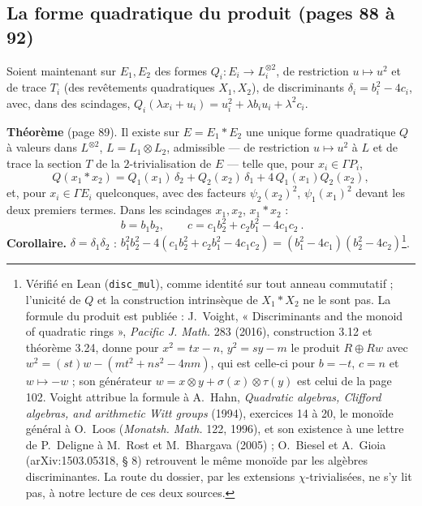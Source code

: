 \documentclass[11pt,a4paper]{article}
\begin{document}
\subsection*{La forme quadratique du produit (pages 88 à 92)}

Soient maintenant sur $E_1, E_2$ des formes $Q_i : E_i \to L_i^{\otimes 2}$, de restriction
$u \mapsto u^{2}$ et de trace $T_i$ (des revêtements quadratiques $X_1, X_2$), de
discriminants $\delta_i = b_i^{2} - 4c_i$, avec, dans des scindages,
$Q_i(\lambda x_i + u_i) = u_i^{2} + \lambda b_iu_i + \lambda^{2}c_i$.

\textbf{Théorème} (page 89). Il existe sur $E = E_1 * E_2$ une unique forme
quadratique $Q$ à valeurs dans $L^{\otimes 2}$, $L = L_1 \otimes L_2$, admissible ---
de restriction $u \mapsto u^{2}$ à $L$ et de trace la section $T$ de la
$2$-trivialisation de $E$ --- telle que, pour $x_i \in \Gamma P_i$,
\[
  Q(x_1 * x_2) = Q_1(x_1)\,\delta_2 + Q_2(x_2)\,\delta_1 + 4\,Q_1(x_1)Q_2(x_2),
\]
et, pour $x_i \in \Gamma E_i$ quelconques, avec des facteurs $\psi_2(x_2)^{2}$,
$\psi_1(x_1)^{2}$ devant les deux premiers termes. Dans les scindages $x_1, x_2$,
$x_1 * x_2$ :
\[
  \boxed{\ b = b_1b_2, \qquad c = c_1b_2^{2} + c_2b_1^{2} - 4c_1c_2\ } .
\]
\textbf{Corollaire.} $\delta = \delta_1\delta_2$ : $b_1^{2}b_2^{2} - 4(c_1b_2^{2} + c_2b_1^{2} -
4c_1c_2) = (b_1^{2} - 4c_1)(b_2^{2} - 4c_2)$\footnote{Vérifié en Lean
(\texttt{disc\_mul}), comme identité sur tout anneau commutatif ; l'unicité de $Q$ et
la construction intrinsèque de $X_1 * X_2$ ne le sont pas. La formule du produit
est publiée : J.~Voight, « Discriminants and the monoid of quadratic rings »,
\emph{Pacific J. Math.} 283 (2016), construction 3.12 et théorème 3.24, donne pour
$x^{2} = tx - n$, $y^{2} = sy - m$ le produit $R \oplus Rw$ avec $w^{2} = (st)w -
(mt^{2} + ns^{2} - 4nm)$, qui est celle-ci pour $b = -t$, $c = n$ et $w \mapsto -w$ ;
son générateur $w = x \otimes y + \sigma(x) \otimes \tau(y)$ est celui de la page 102.
Voight attribue la formule à A.~Hahn, \emph{Quadratic algebras, Clifford algebras,
and arithmetic Witt groups} (1994), exercices 14 à 20, le monoïde général à
O.~Loos (\emph{Monatsh. Math.} 122, 1996), et son existence à une lettre de
P.~Deligne à M.~Rost et M.~Bhargava (2005) ; O.~Biesel et A.~Gioia
(arXiv:1503.05318, § 8) retrouvent le même monoïde par les algèbres
discriminantes. La route du dossier, par les extensions $\chi$-trivialisées, ne
s'y lit pas, à notre lecture de ces deux sources.}.
\end{document}
